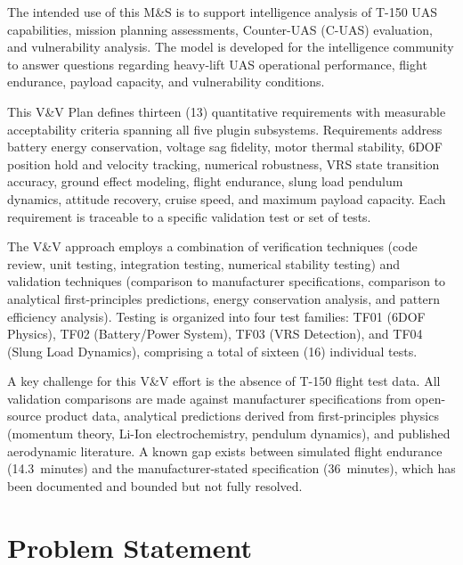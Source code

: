\documentclass[11pt, letterpaper]{article}
\begin{document}
\unclass The intended use of this M\&S is to support intelligence analysis of T-150 UAS capabilities, mission planning assessments, Counter-UAS (C-UAS) evaluation, and vulnerability analysis. The model is developed for the intelligence community to answer questions regarding heavy-lift UAS operational performance, flight endurance, payload capacity, and vulnerability conditions.

\unclass This V\&V Plan defines thirteen (13) quantitative requirements with measurable acceptability criteria spanning all five plugin subsystems. Requirements address battery energy conservation, voltage sag fidelity, motor thermal stability, 6DOF position hold and velocity tracking, numerical robustness, VRS state transition accuracy, ground effect modeling, flight endurance, slung load pendulum dynamics, attitude recovery, cruise speed, and maximum payload capacity. Each requirement is traceable to a specific validation test or set of tests.

\unclass The V\&V approach employs a combination of verification techniques (code review, unit testing, integration testing, numerical stability testing) and validation techniques (comparison to manufacturer specifications, comparison to analytical first-principles predictions, energy conservation analysis, and pattern efficiency analysis). Testing is organized into four test families: TF01 (6DOF Physics), TF02 (Battery/Power System), TF03 (VRS Detection), and TF04 (Slung Load Dynamics), comprising a total of sixteen (16) individual tests.

\unclass A key challenge for this V\&V effort is the absence of T-150 flight test data. All validation comparisons are made against manufacturer specifications from open-source product data, analytical predictions derived from first-principles physics (momentum theory, Li-Ion electrochemistry, pendulum dynamics), and published aerodynamic literature. A known gap exists between simulated flight endurance (14.3~minutes) and the manufacturer-stated specification (36~minutes), which has been documented and bounded but not fully resolved.

\pagebreak


\section{\unclass Problem Statement}
\end{document}
